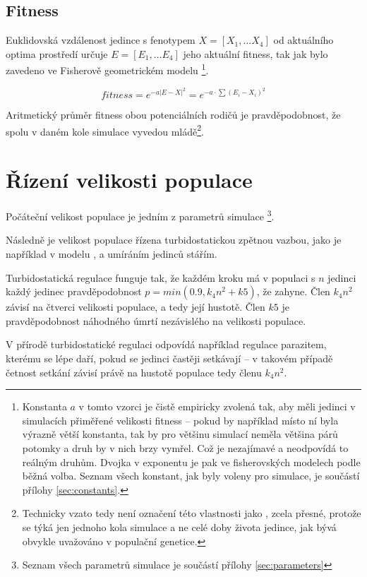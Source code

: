 \subsection{Fitness}

Euklidovská vzdálenost jedince s fenotypem $X = [X_1,\dots{}X_4]$ od aktuálního optima prostředí určuje
$E = [E_1,\dots{} E_4]$ jeho aktuální fitness, tak jak bylo zavedeno ve Fisherově geometrickém modelu
\citep{tenaillon2014utility}\footnote{
Konstanta $a$ v tomto vzorci je čistě empiricky zvolená tak, aby měli jedinci v simulacích
přiměřené velikosti fitness -- pokud by například místo ní byla výrazně větší konstanta, tak by pro většinu simulací
neměla většina párů potomky a druh by v nich brzy vymřel. Což je nezajímavé a neodpovídá to reálným druhům.
Dvojka v exponentu je pak ve fisherovských modelech podle \citet{tenaillon2014utility} běžná volba.
Seznam všech konstant, jak byly voleny pro simulace, je součástí přílohy \ref{sec:constants}.
}.

\begin{equation}
fitness = e^{-a |E-X|^2} = e^{-a\cdot{\sum{(E_i - X_i)^2}}}
\end{equation}

Aritmetický průměr fitness obou potenciálních rodičů je pravděpodobnost, že spolu v daném kole simulace vyvedou
mládě\footnote{Technicky vzato tedy není označení této vlastnosti jako , zcela přesné, protože se týká
jen jednoho kola simulace a ne celé doby života jedince, jak bývá obvykle uvažováno v populační genetice.}.

\section{Řízení velikosti populace}

Počáteční velikost populace je jedním z parametrů simulace
\footnote{Seznam všech parametrů simulace je součástí přílohy \ref{sec:parameters}}.

Následně je velikost populace řízena turbidostatickou
zpětnou vazbou, jako je například v modelu \citet{Flegr139030}, a umíráním jedinců stářím.

Turbidostatická regulace funguje tak, že každém kroku má v populaci s $n$ jedinci každý jedinec pravděpodobnost
$p = min(0.9, k_4 n^2 + k5)$, že zahyne. Člen $k_4 n^2$ závisí na čtverci velikosti populace, a tedy její hustotě.
Člen $k5$ je pravděpodobnost náhodného úmrtí nezávislého na velikosti populace.

V přírodě turbidostatické regulaci odpovídá například regulace parazitem, kterému se lépe daří,
pokud se jedinci častěji setkávají -- v takovém případě četnost setkání závisí právě na hustotě populace tedy členu
$k_4 n^2$.

